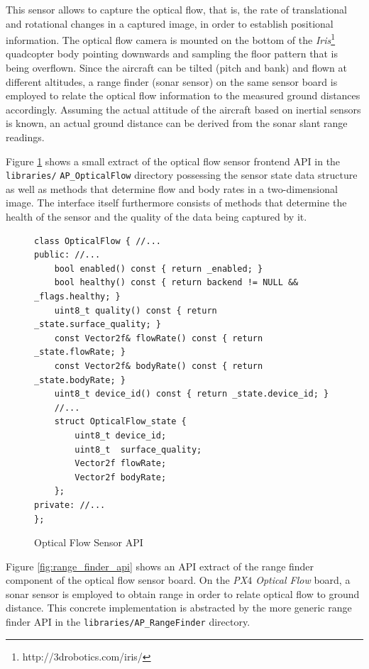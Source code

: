 \documentclass[paper=letter, fontsize=11pt]{scrartcl}
\numberwithin{equation}{section}
\numberwithin{figure}{section}
\numberwithin{table}{section}
\begin{document}
\par
This sensor allows to capture the optical flow, that is, the rate of
translational and rotational changes in a captured image, in order to establish
positional information. The optical flow camera is mounted on the bottom of the
{\em Iris}\footnote{http://3drobotics.com/iris/} quadcopter body pointing
downwards and sampling the floor pattern that is being overflown. Since the
aircraft can be tilted (pitch and bank) and flown at different altitudes, a
range finder (sonar sensor) on the same sensor board is employed to relate the
optical flow information to the measured ground distances accordingly. Assuming
the actual attitude of the aircraft based on inertial sensors is known, an
actual ground distance can be derived from the sonar slant range readings.

\par
Figure \ref{fig:optical_flow_api} shows a small extract of the optical flow
sensor frontend \ac{API} in the \texttt{libraries/} \texttt{AP\_OpticalFlow}
directory possessing the sensor state data structure as well as methods that determine
flow and body rates in a two-dimensional image. The interface itself
furthermore consists of methods that determine the health of the sensor and the
quality of the data being captured by it.

\begin{figure}[h]
	\begin{lstlisting}[basicstyle=\scriptsize]
class OpticalFlow { //...
public: //...
	bool enabled() const { return _enabled; }
	bool healthy() const { return backend != NULL && _flags.healthy; }
	uint8_t quality() const { return _state.surface_quality; }
	const Vector2f& flowRate() const { return _state.flowRate; }
	const Vector2f& bodyRate() const { return _state.bodyRate; }
	uint8_t device_id() const { return _state.device_id; }
    //...
    struct OpticalFlow_state {
    	uint8_t device_id;
    	uint8_t  surface_quality;
    	Vector2f flowRate;
    	Vector2f bodyRate;
    };
private: //...
};
	\end{lstlisting}
	\caption{Optical Flow Sensor \ac{API}}
	\label{fig:optical_flow_api}
\end{figure}

\par
Figure \ref{fig:range_finder_api} shows an \ac{API} extract of the range finder
component of the optical flow sensor board. On the {\em PX$4$ Optical Flow}
board, a sonar sensor is employed to obtain range in order to relate optical
flow to ground distance. This concrete implementation is abstracted by the
more generic range finder \ac{API} in the \texttt{libraries/AP\_RangeFinder}
directory.
\end{document}
